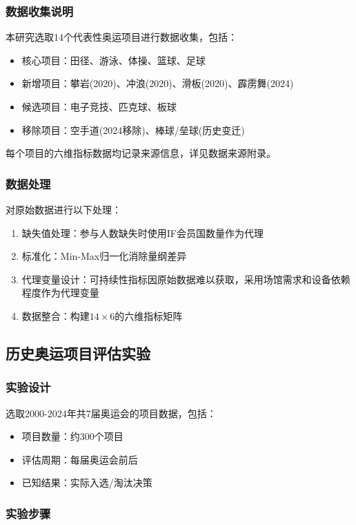 \subsubsection{数据收集说明}

本研究选取14个代表性奥运项目进行数据收集，包括：
\begin{itemize}
\item 核心项目：田径、游泳、体操、篮球、足球
\item 新增项目：攀岩(2020)、冲浪(2020)、滑板(2020)、霹雳舞(2024)
\item 候选项目：电子竞技、匹克球、板球
\item 移除项目：空手道(2024移除)、棒球/垒球(历史变迁)
\end{itemize}

每个项目的六维指标数据均记录来源信息，详见数据来源附录。

\subsubsection{数据处理}

对原始数据进行以下处理：
\begin{enumerate}
\item 缺失值处理：参与人数缺失时使用IF会员国数量作为代理
\item 标准化：Min-Max归一化消除量纲差异
\item 代理变量设计：可持续性指标因原始数据难以获取，采用场馆需求和设备依赖程度作为代理变量
\item 数据整合：构建$14 \times 6$的六维指标矩阵
\end{enumerate}

\subsection{历史奥运项目评估实验}

\subsubsection{实验设计}

选取2000-2024年共7届奥运会的项目数据，包括：
\begin{itemize}
\item 项目数量：约300个项目
\item 评估周期：每届奥运会前后
\item 已知结果：实际入选/淘汰决策
\end{itemize}

\subsubsection{实验步骤}

